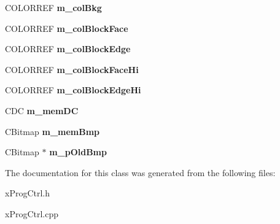 \begin{DoxyCompactItemize}
\item 
\hypertarget{class_cx_prog_ctrl_a995db149e0fbef8bfea5a83baf14733a}{C\-O\-L\-O\-R\-R\-E\-F {\bfseries m\-\_\-col\-Bkg}}\label{class_cx_prog_ctrl_a995db149e0fbef8bfea5a83baf14733a}

\item 
\hypertarget{class_cx_prog_ctrl_ac0e6c88eb64cfdf0ead69bf934555dca}{C\-O\-L\-O\-R\-R\-E\-F {\bfseries m\-\_\-col\-Block\-Face}}\label{class_cx_prog_ctrl_ac0e6c88eb64cfdf0ead69bf934555dca}

\item 
\hypertarget{class_cx_prog_ctrl_ae4161de719061b5689851c1ca594ccc0}{C\-O\-L\-O\-R\-R\-E\-F {\bfseries m\-\_\-col\-Block\-Edge}}\label{class_cx_prog_ctrl_ae4161de719061b5689851c1ca594ccc0}

\item 
\hypertarget{class_cx_prog_ctrl_ab4494f91f6fb834698a1e5b1ba2d00b6}{C\-O\-L\-O\-R\-R\-E\-F {\bfseries m\-\_\-col\-Block\-Face\-Hi}}\label{class_cx_prog_ctrl_ab4494f91f6fb834698a1e5b1ba2d00b6}

\item 
\hypertarget{class_cx_prog_ctrl_a1d76fdad7ebf8e5ac4d41c4e98a9e9cf}{C\-O\-L\-O\-R\-R\-E\-F {\bfseries m\-\_\-col\-Block\-Edge\-Hi}}\label{class_cx_prog_ctrl_a1d76fdad7ebf8e5ac4d41c4e98a9e9cf}

\item 
\hypertarget{class_cx_prog_ctrl_ae50d26748127d40a35c64b6baf5d4c4e}{C\-D\-C {\bfseries m\-\_\-mem\-D\-C}}\label{class_cx_prog_ctrl_ae50d26748127d40a35c64b6baf5d4c4e}

\item 
\hypertarget{class_cx_prog_ctrl_af252e6f5dbad6f84c13f365efee53f5b}{C\-Bitmap {\bfseries m\-\_\-mem\-Bmp}}\label{class_cx_prog_ctrl_af252e6f5dbad6f84c13f365efee53f5b}

\item 
\hypertarget{class_cx_prog_ctrl_afd3cf490fe3aab823af7c4cb3ce03294}{C\-Bitmap $\ast$ {\bfseries m\-\_\-p\-Old\-Bmp}}\label{class_cx_prog_ctrl_afd3cf490fe3aab823af7c4cb3ce03294}

\end{DoxyCompactItemize}


The documentation for this class was generated from the following files\-:\begin{DoxyCompactItemize}
\item 
x\-Prog\-Ctrl.\-h\item 
x\-Prog\-Ctrl.\-cpp\end{DoxyCompactItemize}
